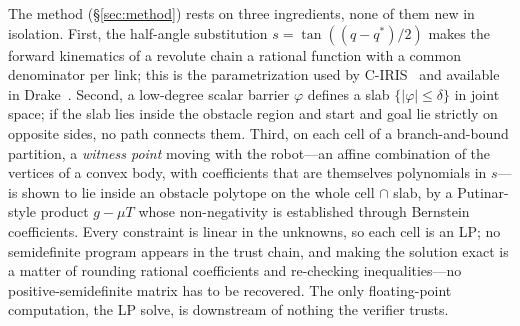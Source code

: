 \documentclass[10pt,twocolumn,letterpaper]{article}
\newcommand{\vphi}{\varphi}
\begin{document}
The method (\S\ref{sec:method}) rests on three ingredients, none of them new in isolation. First, the half-angle substitution $s=\tan((q-q^*)/2)$ makes the forward kinematics of a revolute chain a rational function with a common denominator per link; this is the parametrization used by C-IRIS~\cite{dai2024ciris} and available in Drake~\cite{drake}. Second, a low-degree scalar barrier $\vphi$ defines a slab $\{|\vphi|\le\delta\}$ in joint space; if the slab lies inside the obstacle region and start and goal lie strictly on opposite sides, no path connects them. Third, on each cell of a branch-and-bound partition, a \emph{witness point} moving with the robot---an affine combination of the vertices of a convex body, with coefficients that are themselves polynomials in $s$---is shown to lie inside an obstacle polytope on the whole cell $\cap$ slab, by a Putinar-style product $g-\mu T$ whose non-negativity is established through Bernstein coefficients. Every constraint is linear in the unknowns, so each cell is an LP; no semidefinite program appears in the trust chain, and making the solution exact is a matter of rounding rational coefficients and re-checking inequalities---no positive-semidefinite matrix has to be recovered. The only floating-point computation, the LP solve, is downstream of nothing the verifier trusts.
\end{document}
